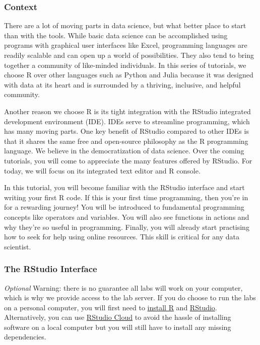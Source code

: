 \documentclass[
]{article}
\begin{document}
\hypertarget{context}{%
\subsubsection{Context}\label{context}}

There are a lot of moving parts in data science, but what better place
to start than with the tools. While basic data science can be
accomplished using programs with graphical user interfaces like Excel,
programming languages are readily scalable and can open up a world of
possibilities. They also tend to bring together a community of
like-minded individuals. In this series of tutorials, we choose R over
other languages such as Python and Julia because it was designed with
data at its heart and is surrounded by a thriving, inclusive, and
helpful community.

Another reason we choose R is its tight integration with the RStudio
integrated development environment (IDE). IDEs serve to streamline
programming, which has many moving parts. One key benefit of RStudio
compared to other IDEs is that it shares the same free and open-source
philosophy as the R programming language. We believe in the
democratization of data science. Over the coming tutorials, you will
come to appreciate the many features offered by RStudio. For today, we
will focus on its integrated text editor and R console.

In this tutorial, you will become familiar with the RStudio interface
and start writing your first R code. If this is your first time
programming, then you're in for a rewarding journey! You will be
introduced to fundamental programming concepts like operators and
variables. You will also see functions in actions and why they're so
useful in programming. Finally, you will already start practising how to
seek for help using online resources. This skill is critical for any
data scientist.

\hypertarget{the-rstudio-interface}{%
\subsubsection{The RStudio Interface}\label{the-rstudio-interface}}

\emph{Optional} Warning: there is no guarantee all labs will work on
your computer, which is why we provide access to the lab server. If you
do choose to run the labs on a personal computer, you will first need to
\href{https://cran.r-project.org/}{install R} and
\href{https://www.rstudio.com/}{RStudio}. Alternatively, you can use
\href{https://rstudio.cloud/}{RStudio Cloud} to avoid the hassle of
installing software on a local computer but you will still have to
install any missing dependencies.
\end{document}
